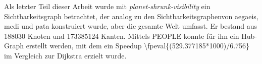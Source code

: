 Als letzter Teil dieser Arbeit wurde mit \emph{planet-shrunk-visibility} ein Sichtbarkeitsgraph betrachtet, der analog zu den Sichtbarkeitsgraphenvon aegaeis, medi und pata konstruiert wurde, aber die gesamte Welt umfasst.
Er bestand aus \num{188030} Knoten und \num{173385124} Kanten.
Mittels PEOPLE konnte für ihn ein Hub-Graph erstellt werden, mit dem ein Speedup \num[round-mode=places,round-precision=0]{\fpeval{(529.377185*1000)/6.756}} im Vergleich zur Dijkstra erzielt wurde.

% 
% 
% 
% 
% 

